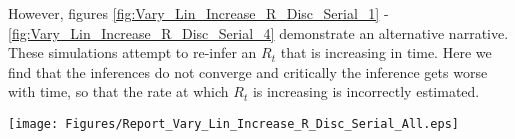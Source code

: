\documentclass[10pt,journal,compsoc]{IEEEtran}
\begin{document}
However, figures \ref{fig:Vary_Lin_Increase_R_Disc_Serial_1} - \ref{fig:Vary_Lin_Increase_R_Disc_Serial_4} demonstrate an alternative 
narrative. These simulations attempt to re-infer an $R_t$ that is increasing in time. Here we find that the inferences do not converge and critically the inference  gets worse with time, so that the rate at which $R_t$ is increasing is incorrectly estimated.

\begin{figure*}
\centering
\texttt{[image: Figures/Report\_Vary\_Lin\_Increase\_R\_Disc\_Serial\_All.eps]}
\label{fig:Vary_Lin_Decrease_R_Disc_Serial_All}
\end{figure*}









\end{document}
